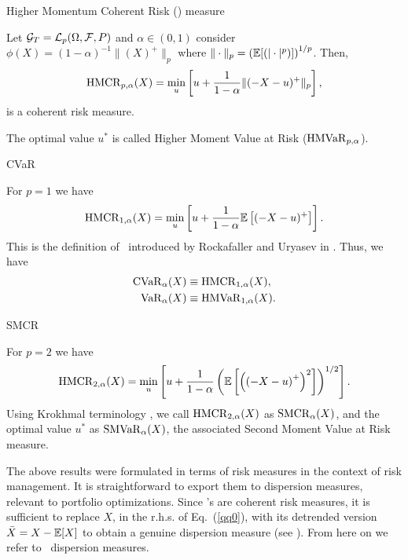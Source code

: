 \begin{theorem}{Higher Momentum Coherent Risk (\HMCR) measure}

    \noindent Let ${\cal G}_T = {\cal L}_p(\Omega, {\cal F}, P)$ and $\alpha \in(0,1)$ consider $\phi(X) = (1-\alpha)^{-1}\| (X)^+ \|_p$
    where $\|\cdot\|_p= \left({\mathbb E}[(|\cdot|^p)]\right)^{1/p}$. Then,
    \begin{equation}
        \HMCR_{p,\alpha}(X) = \min_u\left[u + \frac{1}{1-\alpha}\|(-X - u)^+\|_p\right],
        \label{qq0}
    \end{equation}
    is a coherent risk measure.

    \noindent The optimal value $u^*$ is called Higher Moment Value at Risk (${\rm HMVaR}_{p,\alpha}$).
\end{theorem}

\begin{corollary}{CVaR}

    \noindent For $p=1$ we have
    \begin{equation}
        \HMCR_{1,\alpha}(X) = \min_u\left[u + \frac{1}{1-\alpha}\mE\left[ (-X - u)^+\right] \right].
        \label{qq1}
    \end{equation}
    This is the definition of \CVaR\ introduced by Rockafaller and Uryasev in \cite{Uryasev}.
    Thus, we have
    \begin{align}
        {\rm CVaR}_\alpha(X) &\equiv {\rm HMCR}_{1,\alpha}(X), \\
        {\rm VaR}_\alpha(X) &\equiv {\rm HMVaR}_{1,\alpha}(X).
    \end{align}
\end{corollary}

\begin{corollary}{SMCR}

    \noindent For $p=2$ we have
    \begin{equation}
        \HMCR_{2,\alpha}(X) = \min_u\left[u + \frac{1}{1-\alpha}\left(\mE\left[ \left(\left(-X -u\right)^+\right)^2\right]\right)^{1/2} \right].
        \label{qq2}
    \end{equation}
    Using Krokhmal terminology \cite{Krokhmal}, we call ${\rm HMCR}_{2,\alpha}(X)$ as ${\rm SMCR}_\alpha(X)$, and the optimal value $u^*$ as ${\rm SMVaR}_\alpha(X)$,
    the associated Second Moment Value at Risk  measure.
\end{corollary}

The above results were formulated in terms of risk measures in the context of risk management. It is straightforward to
export them to dispersion measures, relevant to portfolio optimizations. Since \HMCR's are coherent risk measures,
it is sufficient to replace $X$, in the r.h.s. of Eq.~(\ref{qq0}), with its detrended version ${\bar X} = X - {\mathbb E}[X]$ to
obtain a genuine dispersion measure (see \cite{MM}). From here on we refer to \HMCR\ dispersion measures.

